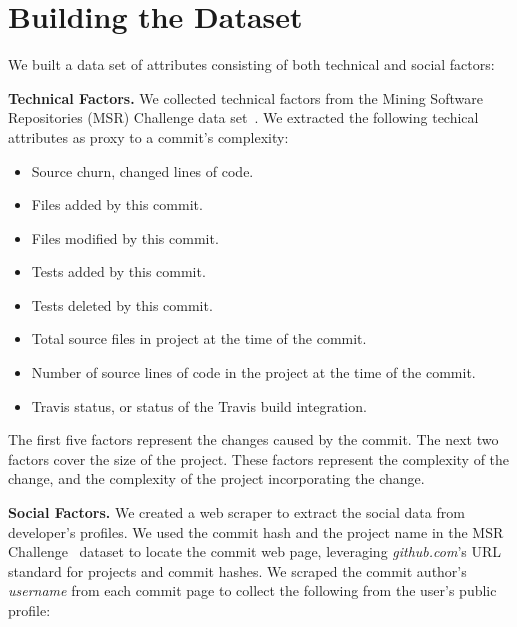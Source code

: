 \documentclass[10pt, conference]{IEEEtran}
\begin{document}
\section{Building the Dataset}
\label{approach}

We built a data set of
attributes consisting of both technical and social factors:

\vspace{1ex}
\noindent\textbf{Technical Factors.} We collected technical factors from the 
Mining Software Repositories (MSR) Challenge data set~\cite{msr17challenge}.
We extracted the following techical attributes as proxy to a commit's
complexity: 
\begin{itemize}
\item Source churn, changed lines of code.
\item Files added by this commit.
\item Files modified by this commit.
\item Tests added by this commit.
\item Tests deleted by this commit.
\item Total source files in project at the time of the commit.
\item Number of source lines of code in the project at
	the time of the commit.
\item Travis status, or status of the Travis build integration.
\end{itemize}

The first five factors represent the changes caused by the commit.  The next two
factors cover the size of the project.  These factors represent the complexity
of the change, and the complexity of the project incorporating the change. 

\vspace{1ex}
\noindent\textbf{Social Factors.} We created a web scraper to extract the social data
from developer's profiles.
We used the commit hash and the project name in the 
MSR Challenge~\cite{msr17challenge} dataset to locate the
commit web page, leveraging \textit{github.com}'s URL standard for projects and
commit hashes.
%
We scraped the commit author's
\textit{username} from each commit page to
collect the following from the user's public profile:
%
\end{document}
